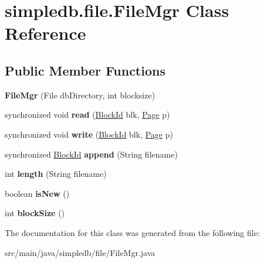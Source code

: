 \hypertarget{classsimpledb_1_1file_1_1FileMgr}{}\section{simpledb.\+file.\+File\+Mgr Class Reference}
\label{classsimpledb_1_1file_1_1FileMgr}
\subsection*{Public Member Functions}
\begin{DoxyCompactItemize}
\item 
\mbox{\label{classsimpledb_1_1file_1_1FileMgr_aa1f8b6976496544c5588d178e84324ed}} 
{\bfseries File\+Mgr} (File db\+Directory, int blocksize)
\item 
\mbox{\label{classsimpledb_1_1file_1_1FileMgr_ace1b0a53268c2a0af3a8c3be8a6c8019}} 
synchronized void {\bfseries read} (\hyperlink{classsimpledb_1_1file_1_1BlockId}{Block\+Id} blk, \hyperlink{classsimpledb_1_1file_1_1Page}{Page} p)
\item 
\mbox{\label{classsimpledb_1_1file_1_1FileMgr_a1d69dd1adc29a1d8e1ece1b94a0b2a28}} 
synchronized void {\bfseries write} (\hyperlink{classsimpledb_1_1file_1_1BlockId}{Block\+Id} blk, \hyperlink{classsimpledb_1_1file_1_1Page}{Page} p)
\item 
\mbox{\label{classsimpledb_1_1file_1_1FileMgr_af29af6d58a78986a187cdad786dd74c2}} 
synchronized \hyperlink{classsimpledb_1_1file_1_1BlockId}{Block\+Id} {\bfseries append} (String filename)
\item 
\mbox{\label{classsimpledb_1_1file_1_1FileMgr_a6f61101fda31aabc393188d2b4a2a27e}} 
int {\bfseries length} (String filename)
\item 
\mbox{\label{classsimpledb_1_1file_1_1FileMgr_adcf8e6d597a10f4f2a141297bc940d98}} 
boolean {\bfseries is\+New} ()
\item 
\mbox{\label{classsimpledb_1_1file_1_1FileMgr_a4bb42c17643d590bb14c0f7ccf58cd78}} 
int {\bfseries block\+Size} ()
\end{DoxyCompactItemize}


The documentation for this class was generated from the following file\+:\begin{DoxyCompactItemize}
\item 
src/main/java/simpledb/file/File\+Mgr.\+java\end{DoxyCompactItemize}
